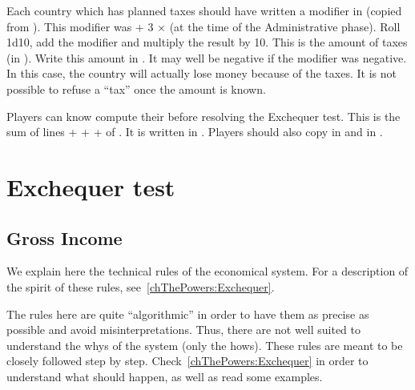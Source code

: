 \bparag Each country which has planned taxes should have written a modifier in
 (copied from
). This modifier was \ADM + 3
$\times$ \STAB (at the time of the Administrative phase).
\bparag Roll 1d10, add the modifier and multiply the result by 10. This is the
amount of taxes (in \ducats).
\bparag Write this amount in . It may well be
negative if the modifier was negative. In this case, the country will actually
lose money because of the taxes. It is not possible to refuse a ``tax'' once
the amount is known.

\bparag Players can know compute their \RT before resolving the Exchequer
test.
\bparag This is the sum of lines  +
 +  +
 of \EcoRS. It is written in .
\bparag Players should also copy  in
 and  in
.

\section{Exchequer test}\label{chPeace:Exchequer test}
\subsection{Gross Income}
\begin{designnote}
  We explain here the technical rules of the economical system. For a
  description of the spirit of these rules, see~\ref{chThePowers:Exchequer}.

  The rules here are quite ``algorithmic'' in order to have them as precise as
  possible and avoid misinterpretations. Thus, there are not well suited to
  understand the whys of the system (only the hows). These rules are meant to
  be closely followed step by step. Check~\ref{chThePowers:Exchequer} in order
  to understand what should happen, as well as read some examples.
\end{designnote}

